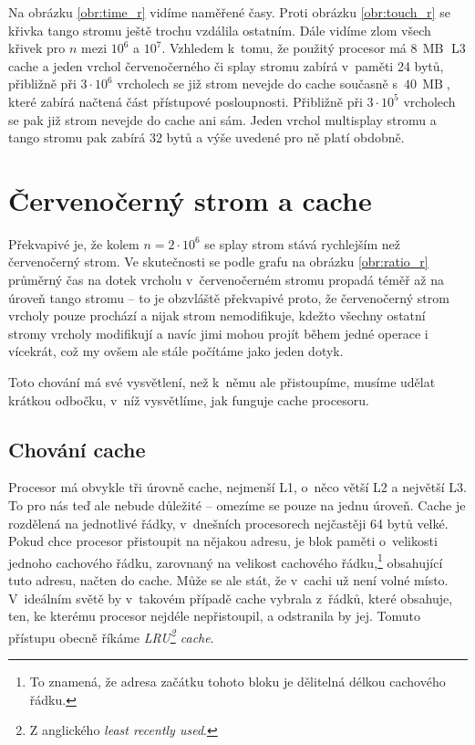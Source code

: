 
Na obrázku \ref{obr:time_r} vidíme naměřené časy. Proti obrázku \ref{obr:touch_r}
se křivka tango stromu ještě trochu vzdálila ostatním. Dále vidíme zlom všech
křivek pro $n$ mezi $10^6$ a $ 10^7$. Vzhledem k~tomu, že použitý
procesor má $8\,\operatorname{MB}$ L3 cache a jeden vrchol  červenočerného či
splay stromu zabírá v~paměti 24 bytů, přibližně při $3\cdot 10^6$ vrcholech se již
strom nevejde do cache současně s~$40\,\operatorname{MB}$, které zabírá načtená
část přístupové posloupnosti. Přibližně při $3\cdot10^5$ vrcholech se pak již strom nevejde do cache ani sám.
Jeden vrchol multisplay stromu a tango stromu pak zabírá 32 bytů a výše uvedené pro ně platí obdobně. 


\section{Červenočerný strom a cache}\label{sec:rb_and_cache}

Překvapivé je, že kolem $n=2\cdot10^6$ se splay strom stává rychlejším než
červenočerný strom. Ve skutečnosti se podle grafu na obrázku \ref{obr:ratio_r}
průměrný čas na dotek vrcholu v~červenočerném stromu propadá téměř až na úroveň tango
stromu -- to je obzvláště překvapivé proto, že červenočerný strom vrcholy pouze
prochází a nijak strom nemodifikuje, kdežto všechny ostatní stromy vrcholy
modifikují a navíc jimi mohou projít během jedné operace i vícekrát, což my
ovšem ale stále počítáme jako jeden dotyk.

Toto chování má své vysvětlení, než k~němu ale přistoupíme, musíme
udělat krátkou odbočku, v~níž vysvětlíme, jak funguje cache procesoru.

\subsection{Chování cache}

Procesor má obvykle tři úrovně cache, nejmenší L1, o~něco větší L2 a největší
L3. To pro nás teď ale nebude důležité -- omezíme se pouze na jednu úroveň.
Cache je rozdělená na jednotlivé řádky, v~dnešních procesorech nejčastěji 64 bytů
velké. Pokud chce procesor přistoupit na nějakou adresu, je blok paměti
o~velikosti jednoho cachového řádku, zarovnaný na velikost cachového
řádku,\footnote{To znamená, že adresa začátku tohoto bloku je dělitelná délkou
cachového řádku.} obsahující tuto adresu, načten do cache. Může se ale stát,
že v~cachi už není volné místo. V~ideálním světě by v~takovém případě cache
vybrala z~řádků, které obsahuje, ten, ke kterému procesor nejdéle nepřistoupil,
a odstranila by jej. Tomuto přístupu obecně říkáme \emph{LRU\footnote{Z
anglického \emph{least recently used}.} cache}.

